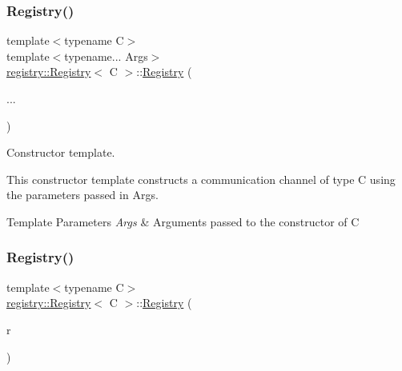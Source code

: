\mbox{\label{classregistry_1_1Registry_ae4e32a61c71b9014a96505346147924a}} 
\subsubsection{\texorpdfstring{Registry()}{Registry()}\hspace{0.1cm}{\footnotesize\ttfamily [2/5]}}
{\footnotesize\ttfamily template$<$typename C$>$ \\
template$<$typename... Args$>$ \\
\hyperlink{classregistry_1_1Registry}{registry\+::\+Registry}$<$ C $>$\+::\hyperlink{classregistry_1_1Registry}{Registry} (\begin{DoxyParamCaption}\item[{Args \&\&}]{... }\end{DoxyParamCaption})\hspace{0.3cm}{\ttfamily [noexcept]}}



Constructor template. 

This constructor template constructs a communication channel of type C using the parameters passed in Args.


\begin{DoxyTemplParams}{Template Parameters}
{\em Args} & Arguments passed to the constructor of C \\
\hline
\end{DoxyTemplParams}
\mbox{\label{classregistry_1_1Registry_a94a766d55d2bacfbf8eda23efb742d92}} 
\subsubsection{\texorpdfstring{Registry()}{Registry()}\hspace{0.1cm}{\footnotesize\ttfamily [3/5]}}
{\footnotesize\ttfamily template$<$typename C$>$ \\
\hyperlink{classregistry_1_1Registry}{registry\+::\+Registry}$<$ C $>$\+::\hyperlink{classregistry_1_1Registry}{Registry} (\begin{DoxyParamCaption}\item[{\hyperlink{classregistry_1_1Registry}{Registry}$<$ C $>$ const \&}]{r }\end{DoxyParamCaption})\hspace{0.3cm}{\ttfamily [delete]}}

